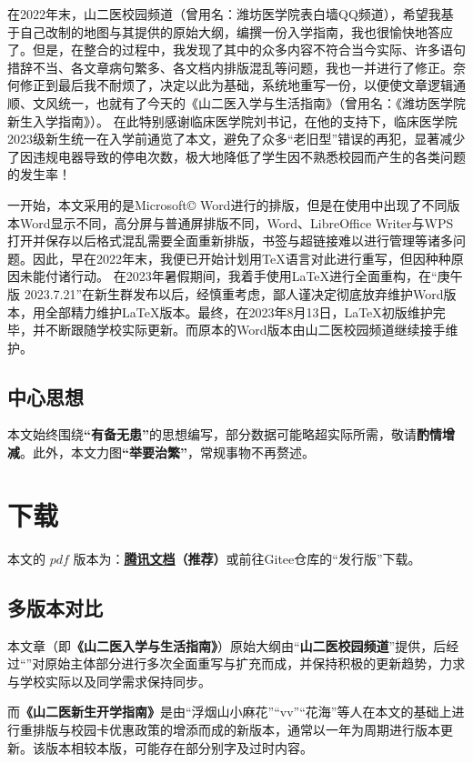 在2022年末，山二医校园频道（曾用名：潍坊医学院表白墙QQ频道），希望我基于自己改制的地图与其提供的原始大纲，编撰一份入学指南，我也很愉快地答应了。但是，在整合的过程中，我发现了其中的众多内容不符合当今实际、许多语句措辞不当、各文章病句繁多、各文档内排版混乱等问题，我也一并进行了修正。奈何修正到最后我不耐烦了，决定以此为基础，系统地重写一份，以便使文章逻辑通顺、文风统一，也就有了今天的《山二医入学与生活指南》（曾用名：《潍坊医学院新生入学指南》）。
在此特别感谢临床医学院刘书记，在他的支持下，临床医学院2023级新生统一在入学前通览了本文，避免了众多“老旧型”错误的再犯，显著减少了因违规电器导致的停电次数，极大地降低了学生因不熟悉校园而产生的各类问题的发生率！

一开始，本文采用的是Microsoft© Word进行的排版，但是在使用中出现了不同版本Word显示不同，高分屏与普通屏排版不同，Word、LibreOffice Writer与WPS打开并保存以后格式混乱需要全面重新排版，书签与超链接难以进行管理等诸多问题。因此，早在2022年末，我便已开始计划用\TeX 语言对此进行重写，但因种种原因未能付诸行动。
在2023年暑假期间，我着手使用\LaTeX 进行全面重构，在“庚午版 2023.7.21”在新生群发布以后，经慎重考虑，鄙人谨决定彻底放弃维护Word版本，用全部精力维护\LaTeX 版本。最终，在2023年8月13日，\LaTeX 初版维护完毕，并不断跟随学校实际更新。而原本的Word版本由山二医校园频道继续接手维护。

\subsection[中心思想]{中心思想}
本文始终围绕\textbf{“有备无患”}的思想编写，部分数据可能略超实际所需，敬请\textbf{酌情增减}。此外，本文力图\textbf{“举要治繁”}，常规事物不再赘述。

\section[下载]{下载}
本文的 $pdf$ 版本\textbf{}为：\textbf{\uline{\href{https://docs.qq.com/s/ETcQ-ZFSrSsh6MK9bm773q}{腾讯文档}}（推荐）}或前往Gitee仓库的“发行版”下载。


\subsection[多版本对比]{多版本对比}
本文章（即\textbf{《山二医入学与生活指南》}）原始大纲由“\textbf{山二医校园频道}”提供，后经过“\textbf{}”对原始主体部分进行多次全面重写与扩充而成，并保持积极的更新趋势，力求与学校实际以及同学需求保持同步。

而\textbf{《山二医新生开学指南》}是由“浮烟山小麻花”“vv”“花海”等人在本文的基础上进行重排版与校园卡优惠政策的增添而成的新版本，通常以一年为周期进行版本更新。该版本相较本版，可能存在部分别字及过时内容。

